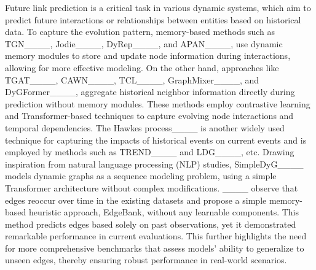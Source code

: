 Future link prediction is a critical task in various dynamic systems, which aim to predict future interactions or relationships between entities based on historical data. 
To capture the evolution pattern, memory-based methods such as TGN____, Jodie____, DyRep____, and APAN____, use dynamic memory modules to store and update node information during interactions, allowing for more effective modeling. 
On the other hand, approaches like TGAT____, CAWN____, TCL____, GraphMixer____, and DyGFormer____, aggregate historical neighbor information directly during prediction without memory modules. These methods employ contrastive learning and Transformer-based techniques to capture evolving node interactions and temporal dependencies. The Hawkes process____ is another widely used technique for capturing the impacts of historical events on current events and is employed by methods such as TREND____ and LDG____, etc.
Drawing inspiration from natural language processing (NLP) studies, SimpleDyG____ models dynamic graphs as a sequence modeling problem, using a simple Transformer architecture without complex modifications.
____ observe that edges reoccur over time in the existing datasets and propose a simple memory-based heuristic approach, EdgeBank, without any learnable components. 
This method predicts edges based solely on past observations, yet it demonstrated remarkable performance in current evaluations. 
This further highlights the need for more comprehensive benchmarks that assess models' ability to generalize to unseen edges, thereby ensuring robust performance in real-world scenarios.